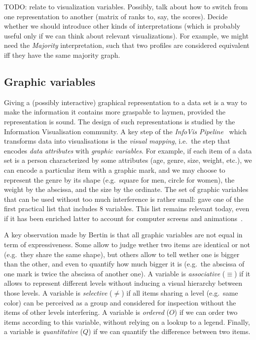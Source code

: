\documentclass[version=last, pagesize, twoside=off, bibliography=totoc, DIV=calc, fontsize=12pt, a4paper, french, english]{scrartcl}
\begin{document}
TODO: relate to visualization variables. Possibly, talk about how to switch from one representation to another (matrix of ranks to, say, the scores). Decide whether we should introduce other kinds of interpretations (which is probably useful only if we can think about relevant visualizations). For example, we might need the \emph{Majority} interpretation, such that two profiles are considered equivalent iff they have the same majority graph.


\subsection{Graphic variables}
Giving a (possibly interactive) graphical representation to a data set is a way to make the information it contains more graspable to laymen, provided the representation is sound.
The design of such representations is studied by the Information Visualisation community.
A key step of the \emph{InfoVis Pipeline}~\citep{Chi-Riedl-1998} which transforms data into visualisations is the \emph{visual mapping}, i.e.\ the step that encodes \emph{data attributes} with \emph{graphic variables}.
For example, if each item of a data set is a person characterized by some attributes (age, genre, size, weight, etc.), we can encode a particular item with a graphic mark, and we may choose to represent the genre by its shape (e.g.\ square for men, circle for women), the weight by the abscissa, and the size by the ordinate.
The set of graphic variables that can be used without too much interference is rather small: \citet[][chap.~II.c]{bertin-graphique} gave one of the first practical list that includes 8 variables.
This list remains relevant today, even if it has been enriched latter to account for computer screens and animations~\citep[e.g.][chap.~5]{munzner}.

A key observation made by Bertin is that all graphic variables are not equal in term of expressiveness.
Some allow to judge wether two items are identical or not (e.g.\ they share the same shape), but others allow to tell wether one is bigger than the other, and even to quantify how much bigger it is (e.g.\ the abscissa of one mark is twice the abscissa of another one).
A variable is \emph{associative} ($\equiv$) if it allows to represent different levels without inducing a visual hierarchy between those levels.
A variable is \emph{selective} ($\neq$) if all items sharing a level (e.g.\ same color) can be perceived as a group and considered for inspection without the items of other levels interfering.
A variable is \emph{ordered} ($O$) if we can order two items according to this variable, without relying on a lookup to a legend.
Finally, a variable is \emph{quantitative} ($Q$) if we can quantify the difference between two items.
\end{document}
